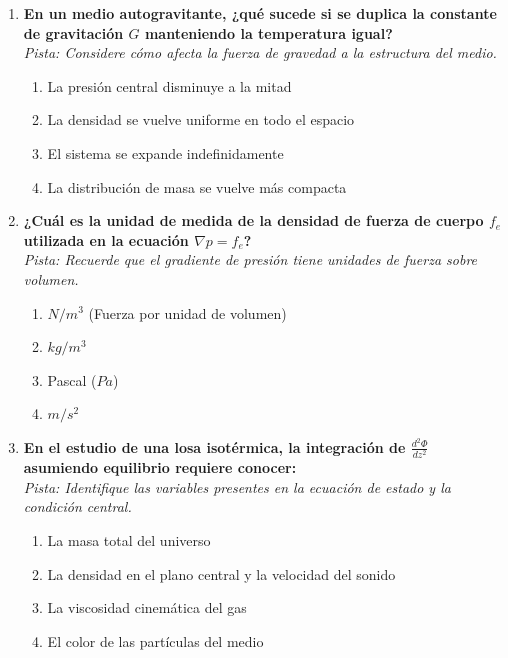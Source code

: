 \documentclass[12pt,a4paper]{article}
\begin{document}
\begin{enumerate}[label=\textbf{\arabic*.}, itemsep=1.5em]
\item \textbf{En un medio autogravitante, ¿qué sucede si se duplica la constante de gravitación $G$ manteniendo la temperatura igual?} \\
\textit{Pista: Considere cómo afecta la fuerza de gravedad a la estructura del medio.}
\begin{enumerate}[label=\alph*), leftmargin=*]
    \item La presión central disminuye a la mitad
    \item La densidad se vuelve uniforme en todo el espacio
    \item El sistema se expande indefinidamente
    \item La distribución de masa se vuelve más compacta
\end{enumerate}

\item \textbf{¿Cuál es la unidad de medida de la densidad de fuerza de cuerpo $f_e$ utilizada en la ecuación $\nabla p = f_e$?} \\
\textit{Pista: Recuerde que el gradiente de presión tiene unidades de fuerza sobre volumen.}
\begin{enumerate}[label=\alph*), leftmargin=*]
    \item $N/m^3$ (Fuerza por unidad de volumen)
    \item $kg/m^3$
    \item Pascal ($Pa$)
    \item $m/s^2$
\end{enumerate}

\item \textbf{En el estudio de una losa isotérmica, la integración de $\frac{d^2\Phi}{dz^2}$ asumiendo equilibrio requiere conocer:} \\
\textit{Pista: Identifique las variables presentes en la ecuación de estado y la condición central.}
\begin{enumerate}[label=\alph*), leftmargin=*]
    \item La masa total del universo
    \item La densidad en el plano central y la velocidad del sonido
    \item La viscosidad cinemática del gas
    \item El color de las partículas del medio
\end{enumerate}


\end{enumerate}
\end{document}
